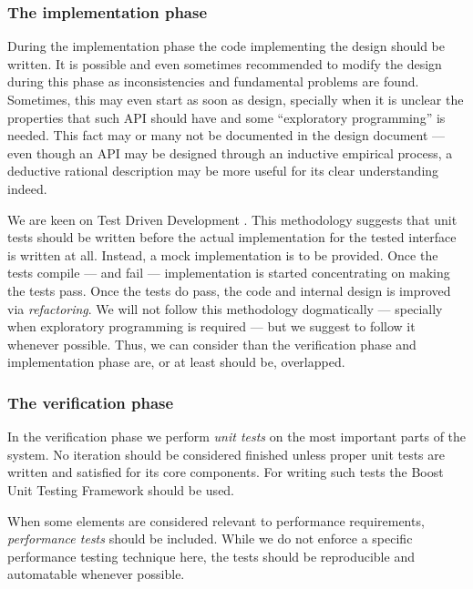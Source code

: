 \subsubsection{The implementation phase}

During the implementation phase the code
implementing the design should be written. It is possible and even
sometimes recommended to modify the design during this phase as
inconsistencies and fundamental problems are found. Sometimes, this
may even start as soon as design, specially when it is unclear the
properties that such API should have and some ``exploratory
programming'' is needed. This fact may or many not be documented in
the design document --- even though an API may be designed through an
inductive empirical process, a deductive rational description may be
more useful for its clear understanding indeed.

We are keen on Test Driven Development \cite{beck02tdd}. This methodology suggests that unit
tests should be written before the actual implementation for the
tested interface is written at all. Instead, a mock implementation is
to be provided. Once the tests compile --- and fail --- implementation
is started concentrating on making the tests pass. Once the tests do
pass, the code and internal design is improved via
\emph{refactoring}. We will not follow this
methodology dogmatically --- specially when exploratory programming is
required --- but we suggest to follow it whenever possible. Thus, we
can consider than the verification phase and implementation phase are,
or at least should be, overlapped.

\subsubsection{The verification phase}

In the verification phase we perform \emph{unit
  tests} on the most important parts of the system. No iteration
should be considered finished unless proper unit tests are written and
satisfied for its core components. For writing such tests the Boost
Unit Testing Framework should be used.

When some elements are considered relevant to performance
requirements, \emph{performance tests} should be included. While we do
not enforce a specific performance testing technique here, the
tests should be reproducible and automatable whenever possible.

